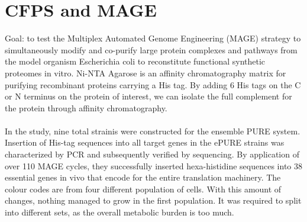 \section{CFPS and MAGE}
Goal: to test the Multiplex Automated Genome Engineering (MAGE) strategy to simultaneously modify and co-purify large protein complexes and pathways from the model organism Escherichia coli to reconstitute functional synthetic proteomes in vitro.
Ni-NTA Agarose is an affinity chromatography matrix for purifying recombinant proteins carrying a His tag. By adding 6 His tags on the C or N terminus on the protein of interest, we can isolate the full complement for the protein through affinity chromatography.
\\
\\
\noindent
In the study, nine total strainis were constructed for the ensemble PURE system.
Insertion of His-tag sequences into all target genes in the ePURE strains was characterized by PCR and subsequently verified by sequencing.
By application of over 110 MAGE cycles, they successfully inserted hexa-histidine sequences into 38 essential genes in vivo that encode for the entire translation machinery.
The colour codes are from four different population of cells. With this amount of changes, nothing managed to grow in the first population.  It was required to split into different sets, as the overall metabolic burden is too much.
